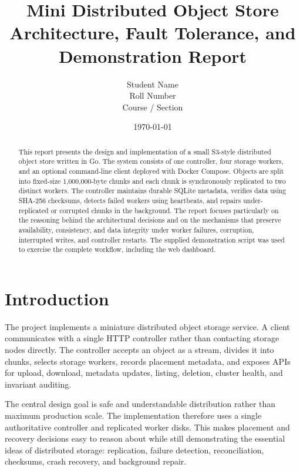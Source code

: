 \documentclass[11pt,a4paper]{article}
\title{Mini Distributed Object Store\\\large Architecture, Fault Tolerance, and Demonstration Report}
\author{Student Name \\ Roll Number \\ Course / Section}
\date{\today}
\begin{document}
\maketitle

\begin{abstract}
This report presents the design and implementation of a small S3-style distributed object store written in Go. The system consists of one controller, four storage workers, and an optional command-line client deployed with Docker Compose. Objects are split into fixed-size 1,000,000-byte chunks and each chunk is synchronously replicated to two distinct workers. The controller maintains durable SQLite metadata, verifies data using SHA-256 checksums, detects failed workers using heartbeats, and repairs under-replicated or corrupted chunks in the background. The report focuses particularly on the reasoning behind the architectural decisions and on the mechanisms that preserve availability, consistency, and data integrity under worker failures, corruption, interrupted writes, and controller restarts. The supplied demonstration script was used to exercise the complete workflow, including the web dashboard.
\end{abstract}

\tableofcontents
\newpage

\section{Introduction}

The project implements a miniature distributed object storage service. A client communicates with a single HTTP controller rather than contacting storage nodes directly. The controller accepts an object as a stream, divides it into chunks, selects storage workers, records placement metadata, and exposes APIs for upload, download, metadata updates, listing, deletion, cluster health, and invariant auditing.

The central design goal is safe and understandable distribution rather than maximum production scale. The implementation therefore uses a single authoritative controller and replicated worker disks. This makes placement and recovery decisions easy to reason about while still demonstrating the essential ideas of distributed storage: replication, failure detection, reconciliation, checksums, crash recovery, and background repair.
\end{document}
